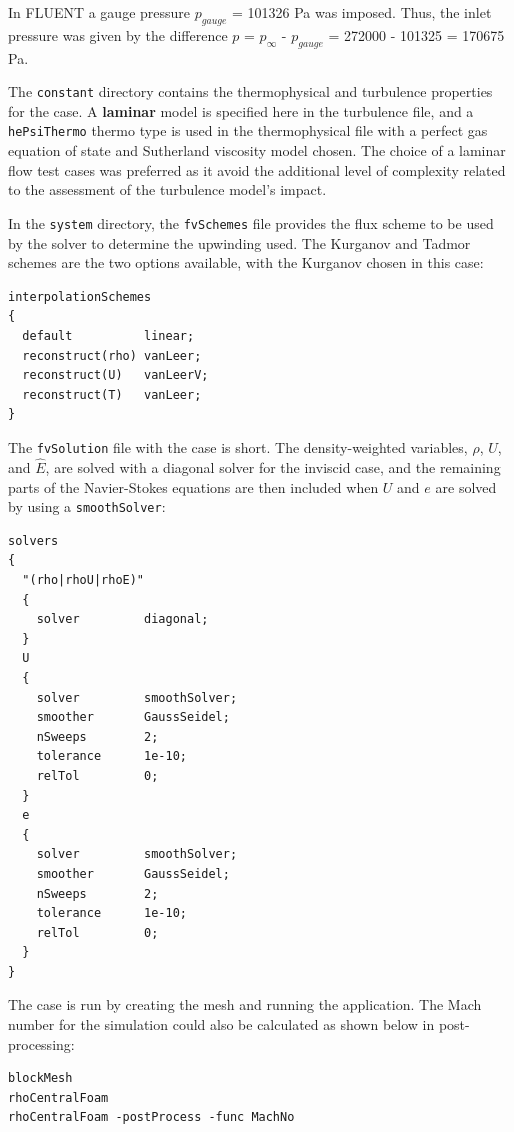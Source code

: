 \documentclass[12pt]{article}
\begin{document}
In FLUENT a gauge pressure $p_{gauge}$ = 101326 Pa was imposed. Thus, the inlet pressure was given by the difference $p$ = $p_\infty$ - $p_{gauge}$ = 272000 - 101325 = 170675 Pa.

The \texttt{constant} directory contains the thermophysical and turbulence properties for the case. A \textbf{laminar} model is specified here in the turbulence file, and a \texttt{hePsiThermo} thermo type is used in the thermophysical file with a perfect gas equation of state and Sutherland viscosity model chosen. The choice of a laminar flow test cases was preferred as it avoid the additional level of complexity related to the assessment of the turbulence model's impact.

In the \texttt{system} directory, the \texttt{fvSchemes} file provides the flux scheme to be used by the solver to determine the upwinding used. The Kurganov and Tadmor schemes are the two options available, with the Kurganov chosen in this case:
%
\begin{verbatim}
interpolationSchemes
{
  default          linear;
  reconstruct(rho) vanLeer;
  reconstruct(U)   vanLeerV;
  reconstruct(T)   vanLeer;
}
\end{verbatim}
%
The \texttt{fvSolution} file with the case is short. The density-weighted variables, $\rho$, $\hat{U}$, and $\hat{E}$, are solved with a diagonal solver for the inviscid case, and the remaining parts of the Navier-Stokes equations are then included when $U$ and $e$ are solved by using a \texttt{smoothSolver}:
%
\begin{verbatim}
solvers
{
  "(rho|rhoU|rhoE)"
  {
    solver         diagonal;
  }
  U
  {
    solver         smoothSolver;
    smoother       GaussSeidel;
    nSweeps        2;
    tolerance      1e-10;
    relTol         0;
  }
  e
  {
    solver         smoothSolver;
    smoother       GaussSeidel;
    nSweeps        2;
    tolerance      1e-10;
    relTol         0;
  }
}
\end{verbatim}
%
The case is run by creating the mesh and running the application. The Mach number for the simulation could also be calculated as shown below in post-processing:
%
\begin{verbatim}
blockMesh
rhoCentralFoam
rhoCentralFoam -postProcess -func MachNo
\end{verbatim}

\end{document}
